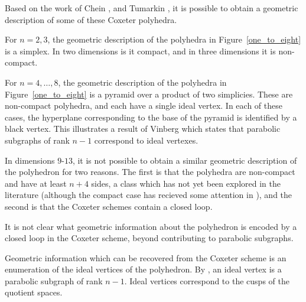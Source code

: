 \documentclass[smallcondensed]{svjour3}                     %
\begin{document}
\begin{figure}[h!]

\end{figure}

Based on the work of Chein \cite{chein69}, and Tumarkin \cite{tumarkin04}, it is possible to obtain a geometric description of some of these Coxeter polyhedra. 
\begin{corollary}
For $n=2, 3$, the geometric description of the polyhedra in Figure~\ref{one_to_eight} is a simplex. In two dimensions is it compact, and in three dimensions it is non-compact.

For $n=4, \ldots, 8$, the geometric description of the polyhedra in Figure~\ref{one_to_eight} is a pyramid over a product of two simplicies. These are non-compact polyhedra, and each have a single ideal vertex. In each of these cases, the hyperplane corresponding to the base of the pyramid is identified by a black vertex. This illustrates a result of Vinberg \cite{vinberg85} which states that parabolic subgraphs of rank $n-1$ correspond to ideal vertexes.
\end{corollary}

 In dimensions $9$-$13$, it is not possible to obtain a similar geometric description of the polyhedron for two reasons. The first is that the polyhedra are non-compact and have at least $n+4$ sides, a class which has not yet been explored in the literature (although the compact case has recieved some attention in \cite{tumarkinfelikson08}), and the second is that the Coxeter schemes contain a closed loop. 

It is not clear what geometric information about the polyhedron is encoded by a closed loop in the Coxeter scheme, beyond contributing to parabolic subgraphs.

Geometric information which can be recovered from the Coxeter scheme is an enumeration of the ideal vertices of the polyhedron. By \cite{vinberg85}, an ideal vertex is a parabolic subgraph of rank $n-1$. Ideal vertices correspond to the cusps of the quotient spaces. 
\end{document}
